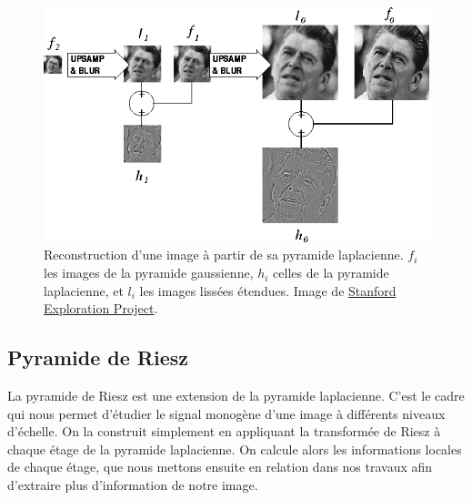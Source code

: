 \begin{figure}
    \centering
    \includegraphics[width=.85\textwidth]{contenu/resources/images/laplacian_pyramid_reconstruction}
    \caption[Reconstruction d'une image à partir de sa pyramide laplacienne]{Reconstruction d'une image à partir de sa pyramide laplacienne. $f_i$ les images de la pyramide gaussienne, $h_i$ celles de la pyramide laplacienne, et $l_i$ les images lissées étendues. Image de \href{https://web.archive.org/web/20230203082428/http://sepwww.stanford.edu/data/media/public/sep/morgan/texturematch/paper_html/node3.html}{Stanford Exploration Project}.}
    \label{fig:laplace-reconstruction}
\end{figure}

\subsection{Pyramide de Riesz}

La pyramide de Riesz est une extension de la pyramide laplacienne. C'est le cadre qui nous permet d'étudier le signal monogène d'une image à différents niveaux d'échelle. On la construit simplement en appliquant la transformée de Riesz à chaque étage de la pyramide laplacienne. On calcule alors les informations locales de chaque étage, que nous mettons ensuite en relation dans nos travaux afin d'extraire plus d'information de notre image.

\bigskip

